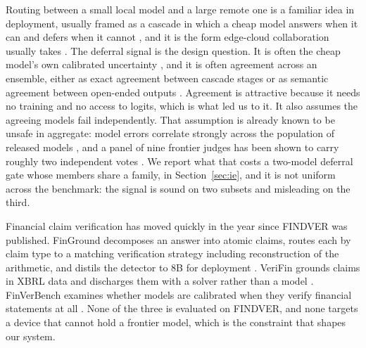 \documentclass{article}
\begin{document}
Routing between a small local model and a large remote one is a familiar idea in deployment,
usually framed as a cascade in which a cheap model answers when it can and defers when it
cannot \citep{moslem2026routing}, and it is the form edge-cloud collaboration usually takes
\citep{li2025collaborative}. The deferral signal is the design question. It is often the
cheap model's own calibrated uncertainty \citep{kotte2026ucci}, and it is often agreement
across an ensemble, either as exact agreement between cascade stages
\citep{kolawole2025agreement} or as semantic agreement between open-ended outputs
\citep{soiffer2025semantic}. Agreement is attractive because it needs no training and no
access to logits, which is what led us to it. It also assumes the agreeing models fail
independently. That assumption is already known to be unsafe in aggregate: model errors
correlate strongly across the population of released models \citep{kim2025correlated}, and
a panel of nine frontier judges has been shown to carry roughly two independent votes
\citep{kohli2026judges}. We report what that costs a two-model deferral gate whose members
share a family, in Section~\ref{sec:ie}, and it is not uniform across the benchmark: the
signal is sound on two subsets and misleading on the third.

Financial claim verification has moved quickly in the year since FINDVER was published.
FinGround decomposes an answer into atomic claims, routes each by claim type to a matching
verification strategy including reconstruction of the arithmetic, and distils the detector
to 8B for deployment \citep{guo2026finground}. VeriFin grounds claims in XBRL data and
discharges them with a solver rather than a model \citep{hall2026verifin}. FinVerBench
examines whether models are calibrated when they verify financial statements at all
\citep{panda2026finverbench}. None of the three is evaluated on FINDVER, and none targets a
device that cannot hold a frontier model, which is the constraint that shapes our system.
\end{document}
